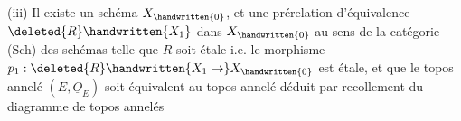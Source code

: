 (iii) Il existe un schéma $X_{\handwritten{0}}$, et une prérelation d'équivalence $\deleted{R}\handwritten{X_1}$ dans $X_{\handwritten{0}}$ au sens de la catégorie (Sch) des schémas \handwritten{,} telle que $R$ soit étale i.e. le morphisme $p_1:\deleted{R}\handwritten{X_1\to}X_{\handwritten{0}}$ est étale, et que le topos annelé $(E,\underline{O}_E)$ soit équivalent au topos annelé déduit par recollement du diagramme  de topos annelés  
